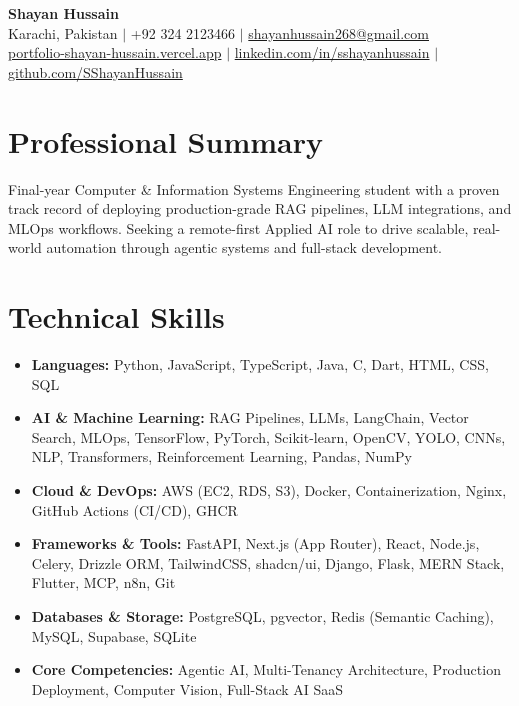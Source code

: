 \documentclass[11pt, a4paper]{article}
\begin{document}
\begin{center}
    {\huge \textbf{Shayan Hussain}} \\ \vspace{4pt}
    Karachi, Pakistan $|$ +92 324 2123466 $|$ \href{mailto:shayanhussain268@gmail.com}{shayanhussain268@gmail.com} \\
    \href{https://portfolio-shayan-hussain.vercel.app/}{portfolio-shayan-hussain.vercel.app} $|$ \href{https://linkedin.com/in/sshayanhussain}{linkedin.com/in/sshayanhussain} $|$ \href{https://github.com/SShayanHussain}{github.com/SShayanHussain}
\end{center}

\section*{Professional Summary}
Final-year Computer \& Information Systems Engineering student with a proven track record of deploying production-grade RAG pipelines, LLM integrations, and MLOps workflows. Seeking a remote-first Applied AI role to drive scalable, real-world automation through agentic systems and full-stack development.

\section*{Technical Skills}
\begin{itemize}[leftmargin=0.15in, label={}]
    \item \textbf{Languages:} Python, JavaScript, TypeScript, Java, C, Dart, HTML, CSS, SQL
    \item \textbf{AI \& Machine Learning:} RAG Pipelines, LLMs, LangChain, Vector Search, MLOps, TensorFlow, PyTorch, Scikit-learn, OpenCV, YOLO, CNNs, NLP, Transformers, Reinforcement Learning, Pandas, NumPy
    \item \textbf{Cloud \& DevOps:} AWS (EC2, RDS, S3), Docker, Containerization, Nginx, GitHub Actions (CI/CD), GHCR
    \item \textbf{Frameworks \& Tools:} FastAPI, Next.js (App Router), React, Node.js, Celery, Drizzle ORM, TailwindCSS, shadcn/ui, Django, Flask, MERN Stack, Flutter, MCP, n8n, Git
    \item \textbf{Databases \& Storage:} PostgreSQL, pgvector, Redis (Semantic Caching), MySQL, Supabase, SQLite
    \item \textbf{Core Competencies:} Agentic AI, Multi-Tenancy Architecture, Production Deployment, Computer Vision, Full-Stack AI SaaS
\end{itemize}
\end{document}
